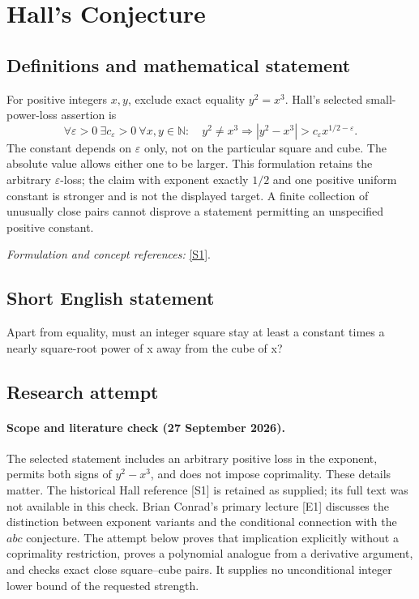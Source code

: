 \documentclass[11pt]{article}
\begin{document}
\section*{\texorpdfstring{Hall's Conjecture}{Hall's Conjecture}}\label{statement}
\subsection{Definitions and mathematical statement}
For positive integers $x,y$, exclude exact equality $y^2=x^3$. Hall's selected small-power-loss assertion is
\[
 \forall{\varepsilon}>0\ \exists c_{\varepsilon}>0\ \forall x,y\in{\mathbb{N}}:\quad
 y^2\ne x^3\Longrightarrow
 |y^2-x^3|>c_{\varepsilon} x^{1/2-{\varepsilon}}.
\]
The constant depends on ${\varepsilon}$ only, not on the particular square and cube. The absolute value allows either one to be larger. This formulation retains the arbitrary ${\varepsilon}$-loss; the claim with exponent exactly $1/2$ and one positive uniform constant is stronger and is not the displayed target. A finite collection of unusually close pairs cannot disprove a statement permitting an unspecified positive constant.
\par\smallskip\textit{Formulation and concept references:} \href{https://doi.org/10.1007/BF01140190}{[S1]}.

\subsection{Short English statement}
Apart from equality, must an integer square stay at least a constant times a nearly square-root power of x away from the cube of x?
\subsection{Research attempt}
\paragraph{Scope and literature check (27 September 2026).}
The selected statement includes an arbitrary positive loss in the exponent, permits both signs of $y^2-x^3$, and does not impose coprimality. These details matter. The historical Hall reference [S1] is retained as supplied; its full text was not available in this check. Brian Conrad's primary lecture [E1] discusses the distinction between exponent variants and the conditional connection with the $abc$ conjecture. The attempt below proves that implication explicitly without a coprimality restriction, proves a polynomial analogue from a derivative argument, and checks exact close square--cube pairs. It supplies no unconditional integer lower bound of the requested strength.
\end{document}
